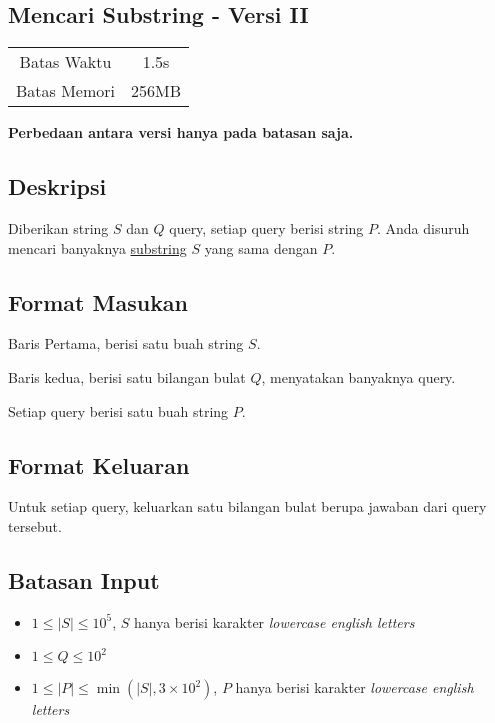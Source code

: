 \documentclass{article}
\begin{document}
\begin{center}
    \section*{Mencari Substring - Versi II} %

    \begin{tabular}{ | c c | }
        \hline
        Batas Waktu  & 1.5s \\    %
        Batas Memori & 256MB \\  %
        \hline
    \end{tabular}
\end{center}

\begin{center}
    \textbf{Perbedaan antara versi hanya pada batasan saja.}
\end{center}

\subsection*{Deskripsi}

Diberikan string $S$ dan $Q$ query, setiap query berisi string $P$. Anda disuruh mencari banyaknya \href{https://en.wikipedia.org/wiki/Substring}{substring} $S$ yang sama dengan $P$.

\subsection*{Format Masukan}
Baris Pertama, berisi satu buah string $S$.

Baris kedua, berisi satu bilangan bulat $Q$, menyatakan banyaknya query.

Setiap query berisi satu buah string $P$.

\subsection*{Format Keluaran}
Untuk setiap query, keluarkan satu bilangan bulat berupa jawaban dari query tersebut.

\subsection*{Batasan Input}

\begin{itemize}
    \item{$1 \leq |S| \leq 10^5$, $S$ hanya berisi karakter \textit{lowercase english letters}}
    \item{$1 \leq Q \leq 10^2$}
    \item{$1 \leq |P| \leq \min(|S|, 3 \times 10^2)$, $P$ hanya berisi karakter \textit{lowercase english letters}}
\end{itemize}
\end{document}
